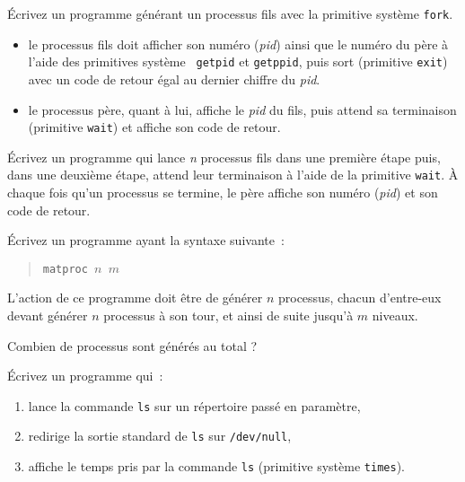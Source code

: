 %


% 


\question

Écrivez un programme générant un processus fils avec la primitive
système {\tt fork}.

\begin {itemize}
    \item le processus fils doit afficher son numéro ({\em pid}) ainsi
	que le numéro du père à l'aide des primitives système {\tt
	getpid} et {\tt getppid}, puis sort (primitive {\tt exit}) avec
	un code de retour égal au dernier chiffre du {\em pid}.

    \item le processus père, quant à lui, affiche le {\em pid} du fils,
	puis attend sa terminaison (primitive {\tt wait}) et affiche son
	code de retour.

\end {itemize}


\question

Écrivez un programme qui lance {\em n} processus fils dans une
première étape puis, dans une deuxième étape, attend leur terminaison
à l'aide de la primitive {\tt wait}.
\`A chaque fois qu'un processus se termine,
le père affiche son numéro ({\em pid}) et son code de retour.


\question

Écrivez un programme ayant la syntaxe suivante~:

\vspace* {-3mm}
\begin {quote}
{\tt matproc $n$ $m$}
\end {quote}

L'action de ce programme doit être de générer $n$ processus, chacun
d'entre-eux devant générer $n$ processus à son tour, et ainsi de suite
jusqu'à $m$ niveaux.

Combien de processus sont générés au total ?


\question

Écrivez un programme qui~:

\begin {enumerate}
    \item lance la commande {\tt ls} sur un répertoire passé en
        paramètre,
    \item redirige la sortie standard de {\tt ls} sur {\tt /dev/null},
    \item affiche le temps pris par la commande {\tt ls} (primitive
	système {\tt times}).
\end {enumerate}


